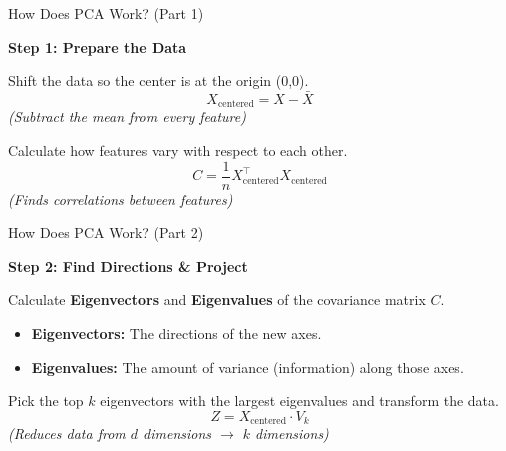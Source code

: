 \begin{frame}{How Does PCA Work? (Part 1)}

\textbf{Step 1: Prepare the Data}

\begin{tcolorbox}[colback=gray!5, colframe=gray!80, title=\textbf{1. Center the Data}]
Shift the data so the center is at the origin (0,0).
\[
X_{\text{centered}} = X - \bar{X}
\]
\small \textit{(Subtract the mean from every feature)}
\end{tcolorbox}

\begin{tcolorbox}[colback=blue!5, colframe=blue!50, title=\textbf{2. Compute Covariance Matrix}]
Calculate how features vary with respect to each other.
\vspace{0.1em}
\[
C = \frac{1}{n} X_{\text{centered}}^\top X_{\text{centered}}
\]
\small \textit{(Finds correlations between features)}
\end{tcolorbox}

\end{frame}

\begin{frame}{How Does PCA Work? (Part 2)}

\textbf{Step 2: Find Directions \& Project}

\begin{tcolorbox}[colback=purple!5, colframe=purple!50, title=\textbf{3. Find Principal Components}]
Calculate \textbf{Eigenvectors} and \textbf{Eigenvalues} of the covariance matrix $C$.
\begin{itemize}
    \item \textbf{Eigenvectors:} The directions of the new axes.
    \item \textbf{Eigenvalues:} The amount of variance (information) along those axes.
\end{itemize}
\end{tcolorbox}

\begin{tcolorbox}[colback=red!5, colframe=red!50, title=\textbf{4. Select \& Project}]
Pick the top $k$ eigenvectors with the largest eigenvalues and transform the data.
\vspace{0.5em}
\[
Z = X_{\text{centered}} \cdot V_k
\]
\small \textit{(Reduces data from $d$ dimensions $\rightarrow$ $k$ dimensions)}
\end{tcolorbox}

\end{frame}

